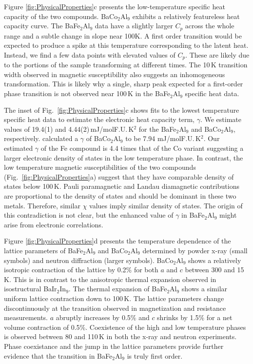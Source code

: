 \documentclass[journal=cmatex,manuscript=article]{achemso}
\begin{document}
\label{sec:Results_CpT}
Figure \ref{fig:PhysicalProperties}c presents the low-temperature specific heat capacity of the two compounds. BaCo$_2$Al$_9$ exhibits a relatively featureless heat capacity curve. The BaFe$_2$Al$_9$ data have a slightly larger $C_p$ across the whole range and a subtle change in slope near 100K. A first order transition would be expected to produce a spike at this temperature corresponding to the latent heat. Instead, we find a few data points with elevated values of $C_p$. These are likely due to the portions of the sample transforming at different times. The 10\,K transition width observed in magnetic susceptibility also suggests an inhomogeneous transformation. This is likely why a single, sharp peak expected for a first-order phase transition is not observed near 100\,K in the BaFe$_2$Al$_9$ specific heat data.

The inset of Fig.~\ref{fig:PhysicalProperties}c shows fits to the lowest temperature specific heat data to estimate the electronic heat capacity term, $\gamma$. We estimate values of 19.4(1) and 4.44(2)\,mJ/molF.U.\,K$^2$ for the BaFe$_2$Al$_9$ and BaCo$_2$Al$_9$, respectively. \citeauthor{Ryzynska2020_SingleCrystalPropertiesMCo2Al9} calculated a $\gamma$ of BaCo$_2$Al$_9$ to be 7.94 mJ/molF.U.\,K$^2$. Our estimated $\gamma$ of the Fe compound is 4.4 times that of the Co variant suggesting a larger electronic density of states in the low temperature phase\cite{Kittel2004_SolidStatePhysics}. In contrast, the low temperature magnetic susceptibilities of the two compounds (Fig.~\ref{fig:PhysicalProperties}a) suggest that they have comparable density of states below 100\,K. Pauli paramagnetic and Landau diamagnetic contributions are proportional to the density of states and should be dominant in these two metals.\cite{Kittel2004_SolidStatePhysics} Therefore, similar $\chi$ values imply similar density of states. The origin of this contradiction is not clear, but the enhanced value of $\gamma$ in BaFe$_2$Al$_9$ might arise from electronic correlations.

\label{sec:Results_acVsT}
Figure \ref{fig:PhysicalProperties}d presents the temperature dependence of the lattice parameters of BaFe$_2$Al$_9$ and BaCo$_2$Al$_9$ determined by powder x-ray (small symbols) and neutron diffraction (larger symbols). BaCo$_2$Al$_9$ shows a relatively isotropic contraction of the lattice by 0.2\% for both $a$ and $c$ between 300 and 15\,K. This is in contrast to the anisotropic thermal expansion observed in isostructural BaIr$_2$In$_9$.\cite{Calta2015_BaIr2In9ThermalExpansion} The thermal expansion of BaFe$_2$Al$_9$ shows a similar uniform lattice contraction down to 100\,K. The lattice parameters change discontinuously at the transition observed in magnetization and resistance measurements. $a$ abruptly increases by 0.5\% and $c$ shrinks by 1.5\% for a net volume contraction of 0.5\%. Coexistence of the high and low temperature phases is observed between 80 and 110\,K in both the x-ray and neutron experiments. Phase coexistance and the jump in the lattice parameters provide further evidence that the transition in BaFe$_2$Al$_9$ is truly first order.
\end{document}
